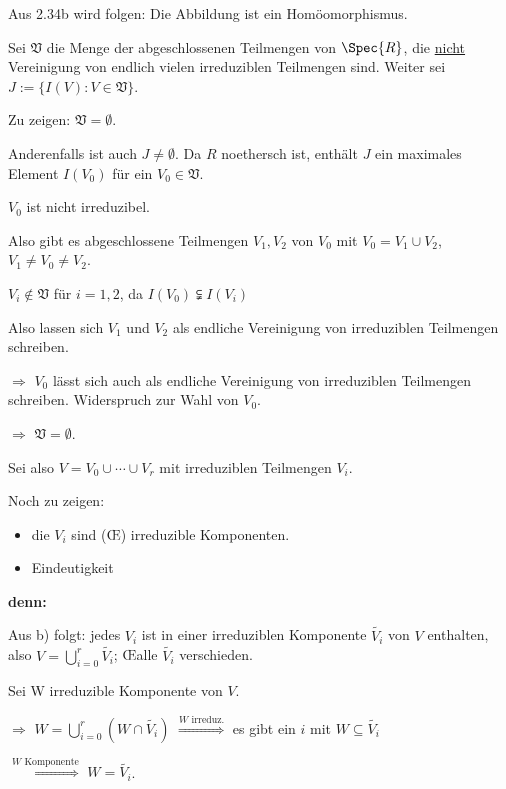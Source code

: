 \begin{DefProp}
\begin{Bew}
\begin{enumerate}
Aus 2.34b wird folgen: Die Abbildung ist ein Hom\"oomorphismus.

Sei $\mathfrak{V}$ die Menge der abgeschlossenen Teilmengen von $\Spec{R}$, die
\underline{nicht} Vereinigung von endlich vielen irreduziblen Teilmengen sind.
Weiter sei $J := \{ I(V) : V \in \mathfrak{V} \}$.

Zu zeigen: $\mathfrak{V} = \emptyset$.

Anderenfalls ist auch $J \neq \emptyset$. Da $R$ noethersch ist, enth\"alt $J$ ein maximales Element $I(V_0)$ f\"ur ein $V_0 \in \mathfrak{V}$.

$V_0$ ist nicht irreduzibel.

Also gibt es abgeschlossene Teilmengen $V_1, V_2$ von $V_0$ mit $V_0 = V_1 \cup V_2$, $V_1 \neq V_0 \neq V_2$.

$V_i \notin \mathfrak{V}$ f\"ur $i = 1,2$, da $I(V_0) \subsetneqq I(V_i)$

Also lassen sich $V_1$ und $V_2$ als endliche Vereinigung von irreduziblen Teilmengen schreiben.

$\Rightarrow$ $V_0$ l\"asst sich auch als endliche Vereinigung von irreduziblen Teilmengen schreiben. Widerspruch zur Wahl von $V_0$.

$\Rightarrow$ $\mathfrak{V} = \emptyset$.
\bigskip

Sei also $V = V_0 \cup \cdots \cup V_r$ mit irreduziblen Teilmengen $V_i$.

Noch zu zeigen: 
\begin{itemize}
\item die $V_i$ sind (\OE) irreduzible Komponenten.
\item Eindeutigkeit
\end{itemize}

\textbf{denn:}

Aus b) folgt: jedes $V_i$ ist in einer irreduziblen Komponente
$\widetilde{V_i}$ von $V$ enthalten, also $V = \bigcup_{i=0}^r
\widetilde{V_i}$; \OE  alle $\widetilde{V_i}$ verschieden.

Sei W irreduzible Komponente von $V$.

$\Rightarrow$ $W = \bigcup_{i=0}^r (W \cap \widetilde{V_i})$ $\overset{W \text{ irreduz.}}\Rightarrow$ es gibt ein $i$ mit $W \subseteq \widetilde{V_i}$

$\overset{W \text{ Komponente}}\Rightarrow$ $W = \widetilde{V_i}$.

\end{enumerate}
\end{Bew}

\end{DefProp}

